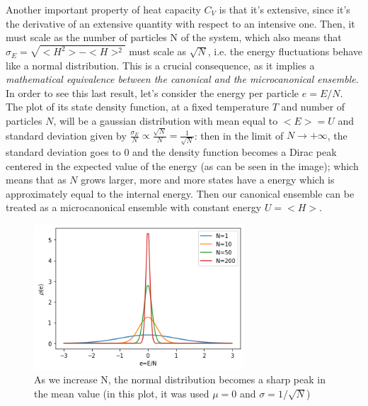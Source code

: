 Another important property of heat capacity $C_V$ is that it's extensive, since it's the derivative of an extensive quantity with respect to an intensive one. Then, it must scale as the number of particles N of the system, which also means that $\sigma_E=\sqrt{<H^2>-<H>^2}$ must scale as $\sqrt{N}$, i.e. the energy fluctuations behave like a normal distribution. This is a crucial consequence, as it implies a \textit{mathematical equivalence between the canonical and the microcanonical ensemble}. In order to see this last result, let's consider the energy per particle $e=E/N$. The plot of its state density function, at a fixed temperature $T$ and number of particles $N$, will be a gaussian distribution with mean equal to $<E>=U$ and standard deviation given by $\frac{\sigma_E}{N}\propto\frac{\sqrt{N}}{N}=\frac{1}{\sqrt{N}}$: then in the limit of $N\to +\infty$, the standard deviation goes to 0 and the density function becomes a Dirac peak centered in the expected value of the energy (as can be seen in the image); which means that as $N$ grows larger, more and more states have a energy which is approximately equal to the internal energy. Then our canonical ensemble can be treated as a microcanonical ensemble with constant energy $U=<H>$.

\begin{figure}[h]
    \centering
    \includegraphics[width=0.7\textwidth]{Statistical mechanics/Images/E1B2D294-498C-45CC-AB94-2A59B549A443.png}
    \caption{As we increase N, the normal distribution becomes a sharp peak in the mean value (in this plot, it was used $\mu=0$ and $\sigma=1/\sqrt{N}$)}
\end{figure}


